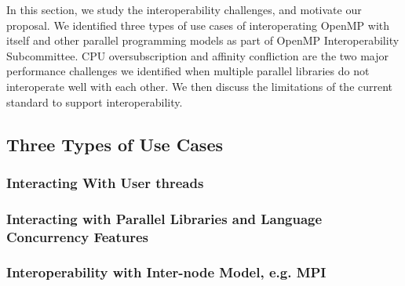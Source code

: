 In this section, we study the interoperability challenges, and motivate our proposal. 
We identified three types of use cases of interoperating OpenMP with itself and other parallel programming models as part of OpenMP Interoperability
Subcommittee. CPU oversubscription and affinity confliction are the two major performance challenges we identified
when multiple parallel libraries do not interoperate well with each other. We then discuss the limitations of the current standard to support 
interoperability. 
\subsection{Three Types of Use Cases} %
\subsubsection{Interacting With User threads}


%

\subsubsection{Interacting with Parallel Libraries and Language Concurrency Features}



\subsubsection{Interoperability with Inter-node Model, e.g. MPI}




